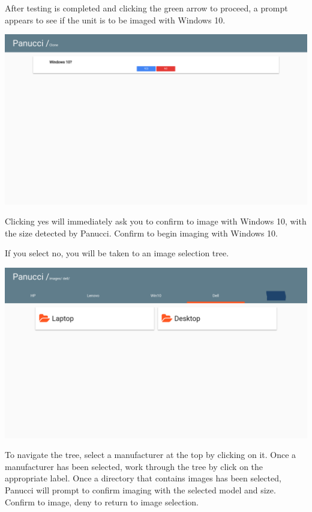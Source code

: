 \documentclass{article}
\begin{document}
\begin{flushleft}
After testing is completed and clicking the green arrow to proceed, a prompt appears to see if the unit is to be imaged with Windows 10.

\includegraphics[width=\textwidth]{win10}

Clicking yes will immediately ask you to confirm to image with Windows 10, with the size detected by Panucci.  Confirm to begin imaging with Windows 10.

If you select no, you will be taken to an image selection tree.

\includegraphics[width=\textwidth]{folder_view}

To navigate the tree, select a manufacturer at the top by clicking on it.  Once a manufacturer has been selected, work through the tree by click on the appropriate label.  Once a directory that contains images has been selected, Panucci will prompt to confirm imaging with the selected model and size.  Confirm to image, deny to return to image selection.
\end{flushleft}
\end{document}
